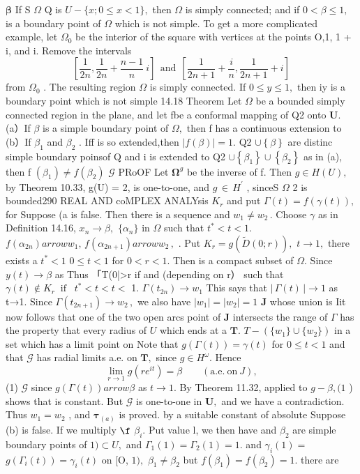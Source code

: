 $\boldsymbol{\beta}$ If S $\Omega$ Q is $U-\{x;0\leq x<1\},$ then $\Omega$ is simply connected; and if $0<\beta\leq1,$ is a boundary point of $\Omega$ which is not simple. To get a more complicated example, let $\Omega_{0}$ be the interior of the square with vertices at the points O,1, 1 + i, and i. Remove the intervals $$ \left[{\frac{1}{2n}},{\frac{1}{2n}}+{\frac{n-1}{n}}\ i\right]\ \ {\mathrm{and}}\ \ \left[{\frac{1}{2n+1}}+{\frac{i}{n}},{\frac{1}{2n+1}}+i\right] $$ from $\Omega_{0}$ . The resulting region $\Omega$ is simply connected. If $0\leq y\leq1,$ then iy is a boundary point which is not simple 14.18 Theorem Let $\Omega$ be a bounded simply connected region in the plane, and let fbe a conformal mapping of Q2 onto ${\boldsymbol{U}}.$ (a）If $\beta$ is a simple boundary point of $\Omega,$ then f has a continuous extension to (b）If $\beta_{1}$ and $\beta_{2}$ . Iff is so extended,then $|f(\beta)|=1.$ Q2 $\cup\left\{\beta\right\}$ are distinc simple boundary poinsof Q and i is extended to Q2 $\cup\left\{\beta_{1}\right\}\cup\left\{\beta_{2}\right\}$ as in (a), then f $(\beta_{1})\neq f(\beta_{2})$ $\scriptstyle{\mathcal{G}}$ PRoOF Let $\mathbf{\Omega}^{g}$ be the inverse of f. Then $g\in H(U),$ by Theorem 10.33, g(U) = 2, is one-to-one, and $\scriptstyle g\,\in\,H^{\prime}$ , sinceS $\Omega$ 2 is bounded290 REAL AND coMPLEX ANALYsis $K_{r}$ and put $\Gamma(t)=f(\gamma(t)),$ for Suppose (a is false. Then there is a sequence and $w_{1}\neq w_{2}\,.$ Choose $\scriptstyle\gamma$ as in Definition 14.16, $x_{n}\to\beta,$ $\{\alpha_{n}\}$ in $\Omega$ such that $t^{*}<t<1.$ $f(\alpha_{2n}) arrow w_{1},\,f(\alpha_{2n+1}) arrow w_{2}\,,$ . Put $K_{r}=g({\tilde{D}}(0;r)),$ $t\to1,$ there exists a $t^{*}<1$ $0\leq t<1$ for $0<r<1.$ Then is a compact subset of $\Omega.$ Since $\scriptstyle y(t)\to\beta$ as Thus 「T(0|>r if and (depending on r） such that $\gamma(t)\notin K_{r}\;\;\mathrm{if}\;\;\;t^{*}<t<t<$ 1. $\Gamma(t_{2n})\to w_{1}$ This says that $|\,\Gamma(t)\,|\to1$ as t→1. Since $\Gamma(t_{2n+1})\to w_{2}\,,$ we also have $|w_{1}|=|w_{2}|=1$ $\boldsymbol{J}$ whose union is Iit now follows that one of the two open arcs point of $\boldsymbol{J}$ intersects the range of ${\Gamma}$ has the property that every radius of $U$ which ends at a ${\boldsymbol{T}}.$ $T-(\{w_{1}\}\cup\{w_{2}\})$ in a set which has a limit point on Note that $g(\Gamma(t))=\gamma(t)$ for $0\leq t<1$ and that $\scriptstyle{\mathcal{G}}$ has radial limits a.e. on ${\boldsymbol{T}},$ since $g\in H^{\omega}.$ Hence $$ \operatorname*{lim}_{r\to1}g(r e^{i t})=\beta\qquad({\mathrm{a.e.~on~}}J), $$ (1) $\scriptstyle{\mathcal{G}}$ since $g(\Gamma(t)) arrow\beta$ as $t\to1.$ By Theorem 11.32, applied to $g-\beta,(1$ ) shows that is constant. But $\scriptstyle{\mathcal{G}}$ is one-to-one in ${\boldsymbol{U}},$ and we have a contradiction. Thus $w_{1}=w_{2}$ , and $\mathbf{\tau}_{(a)}$ is proved. by a suitable constant of absolute Suppose (b) is false. If we multiply $\boldsymbol{\f}$ $\beta_{i}.$ Put value l, we then have and $\beta_{2}$ are simple boundary points of $1)\subset U,$ and $\Gamma_{1}(1)=\Gamma_{2}(1)=1.$ and $\gamma_{i}(1)=$ $g(\Gamma_{i}(t))=\gamma_{i}(t)$ on [O, $1),$ $\beta_{1}\neq\beta_{2}$ but $f(\beta_{1})=f(\beta_{2})=1.$ there are 